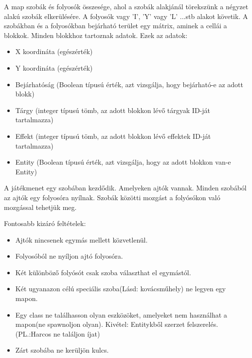 A map szobák és folyosók összesége, ahol a szobák alakjánál törekszünk a négyzet alakú szobák elkerülésére. A folyosók vagy 'I', 'Y' vagy 'L' ...stb alakot követik. A szobákban és a folyosókban bejárható terület egy mátrix, aminek a cellái a blokkok.
Minden blokkhoz tartoznak adatok.
Ezek az adatok:
\begin{itemize}
    \item X koordináta (egészérték)
    \item Y koordináta (egészérték)
    \item Bejárhatóság (Boolean típusú érték, azt vizsgálja, hogy bejárható-e az adott blokk)
    \item Tárgy (integer típusú tömb, az adott blokkon lévő tárgyak ID-ját tartalmazza)
    \item Effekt (integer típusú tömb, az adott blokkon lévő effektek ID-ját tartalmazza)
    \item Entity (Boolean típusú érték, azt vizsgálja, hogy az adott blokkon van-e Entity)
\end{itemize}


A játékmenet egy szobában kezdődik. Amelyeken ajtók vannak. Minden szobából az ajtók egy folyosóra nyílnak. Szobák közötti mozgást a folyósókon való mozgással tehetjük meg.


Fontosabb kizáró feltételek:
\begin{itemize}
    \item Ajtók nincsenek egymás mellett közvetlenül.
    \item Folyosóból ne nyíljon ajtó folyosóra.
    \item Két különböző folyósót csak szoba választhat el egymástól.
    \item Két ugyanazon célú speciális szoba(Lásd: kovácsműhely) ne legyen egy mapon.
    \item Egy class ne találhasson olyan eszközöket, amelyeket nem használhat a mapon(ne spawnoljon olyan). Kivétel: Entitykből szerzet felszerelés. (PL.:Harcos ne találjon íjat)
    \item Zárt szobába ne kerüljön kulcs.
\end{itemize}


